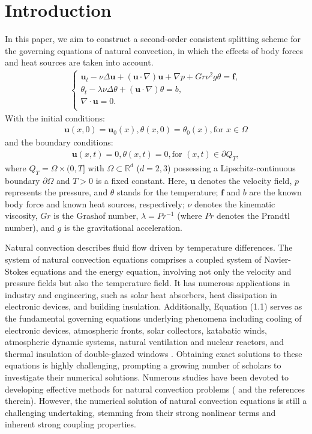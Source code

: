 \documentclass[10pt]{article}
\begin{document}
	\section{Introduction}
	\setcounter{equation}{0}
	In this paper, we aim to construct a second-order consistent splitting scheme for the governing equations of natural convection, in which the effects of body forces and heat sources are taken into account.
	\begin{eqnarray}\label{1.1}
		\left\{\begin{array}{lll} 
			\bm{u}_t - \nu\Delta\bm{ u} + (\bm{u} \cdot \nabla) \bm{u} + \nabla p+Gr\nu^{2}g\theta= \bm{f}, \\
			\theta_t  - \lambda\nu\Delta \theta + (\bm{u} \cdot \nabla)\theta= b, \\	 \nabla \cdot\bm{u} = 0. \\
		\end{array}\right.
	\end{eqnarray}
	With the initial conditions:
	\begin{align}
		\bm{u}(x, 0) = \bm{u}_0(x),   \theta(x, 0) = \theta_0(x),   \text{for } x \in \Omega
	\end{align}
	and the boundary conditions:
	\begin{align}
		\bm{u}(x,t)=0, \theta(x,t)=0,  \text{for }(x,t)\in\partial Q_T,
	\end{align}
	where {  \( Q_T = \Omega \times (0, T] \)} with \( \Omega \subset \mathbb{R}^d \) ($d=2,3$) possessing a Lipschitz-continuous boundary \( \partial\Omega \) and \( T > 0 \) is a fixed constant. Here, \( \bm{u} \) denotes the velocity field, \( p \) represents the pressure, and \( \theta \) stands for the temperature; \( \bm{f} \) and \( b \) are the known body force and known heat sources, respectively; \( \nu \) denotes the kinematic viscosity, \( Gr \) is the Grashof number, \( \lambda = Pr^{-1} \) (where \( Pr \) denotes the Prandtl number), and \( g \) is the gravitational acceleration.
	
	Natural convection describes fluid flow driven by temperature differences. The system of natural convection equations comprises a coupled system of Navier-Stokes equations and the energy equation, involving not only the velocity and pressure fields but also the temperature field. It has numerous applications in industry and engineering, such as solar heat absorbers, heat dissipation in electronic devices, and building insulation. Additionally, Equation (1.1) serves as the fundamental governing equations underlying phenomena including  cooling of electronic devices, atmospheric fronts, solar collectors, katabatic winds, atmospheric dynamic systems, natural ventilation and nuclear reactors, and thermal insulation of double-glazed windows \cite{A2011}. Obtaining exact solutions to these equations is highly challenging, prompting a growing number of scholars to investigate their numerical solutions. Numerous studies have been devoted to developing effective methods for natural convection problems (\cite{Li2004,C2006,Wang2006,Luo2003,Huang2012,Huang20122,T1999} and the references therein). However, the numerical solution of natural convection equations is still a challenging undertaking, stemming from their strong nonlinear terms and inherent strong coupling properties.  
	
\end{document}
